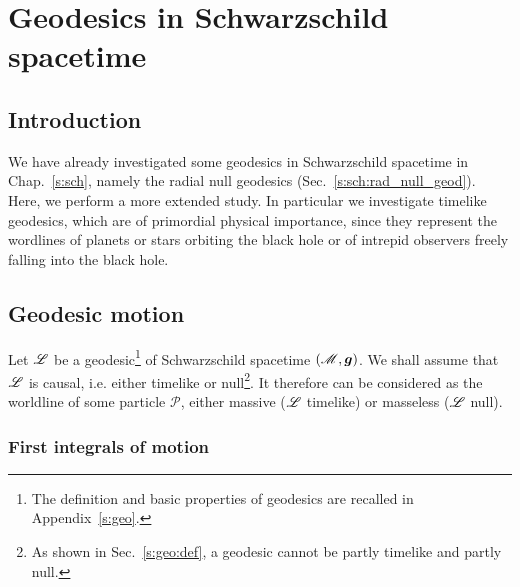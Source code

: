 \chapter{Geodesics in Schwarzschild spacetime}
\label{s:ges}

\minitoc

\section{Introduction}

We have already investigated some geodesics in Schwarzschild spacetime in
Chap.~\ref{s:sch}, namely
the radial null geodesics (Sec.~\ref{s:sch:rad_null_geod}).
Here, we perform a more extended study. In particular we investigate timelike
geodesics, which are of primordial physical importance, since they represent
the wordlines of planets or stars orbiting the black hole or of
intrepid observers freely falling into the black hole.

\section{Geodesic motion}

Let $\mathscr{L}$ be a geodesic\footnote{The definition and basic properties of geodesics
are recalled in Appendix~\ref{s:geo}.} of Schwarzschild spacetime
$(\mathscr{M},\bm{g})$. We shall assume that $\mathscr{L}$ is causal, i.e. either timelike or null\footnote{As
shown in Sec.~\ref{s:geo:def}, a geodesic cannot be partly timelike and partly
null.}. It therefore can be considered as the worldline
of some particle $\mathscr{P}$, either massive
($\mathscr{L}$ timelike) or masseless ($\mathscr{L}$ null).


\subsection{First integrals of motion}

